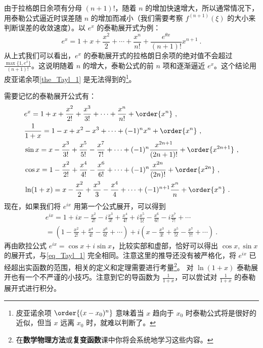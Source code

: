由于拉格朗日余项有分母 $(n+1)!$，随着 $n$ 的增加快速增大，所以通常情况下，用泰勒公式逼近时误差随 $n$ 的增加而减小（我们需要考察 $f^{(n+1)}(\xi)$ 的大小来判断误差的收敛速度）。以 $e^x$ 的泰勒展开式为例：
\begin{equation}
e^x=1+x+\frac{x^2}{2}+\cdots+\frac{x^n}{n!}+\frac{e^{\theta x}}{(n+1)!}x^{n+1}~.
\end{equation}
从上式我们可以看出，$e^x$ 的泰勒展开式的拉格朗日余项的绝对值不会超过 $\frac{\max\{1,e^x\}}{(n+1)!}$。这说明随着 $n$ 的增大，泰勒公式的前 $n$ 项和逐渐逼近 $e^x$。这个结论用皮亚诺余项\autoref{the_Tayl_1} 是无法得到的\footnote{皮亚诺余项 $\order{(x-x_0)^n}$ 意味着当 $x$ 趋向于 $x_0$ 时泰勒公式将是很好的近似，但当 $x$ 远离 $x_0$ 时，就难以判断了。}。

需要记忆的泰勒展开公式有：
\begin{equation}\label{eq_Tayl_1}
\begin{aligned}
&e^x=1+x+\frac{x^2}{2!}+\frac{x^3}{3!}+\cdots+\frac{x^n}{n!}+\order{x^n}~,\\
&\frac{1}{1+x}=1-x+x^2-x^3+\cdots+(-1)^nx^n+\order{x^n}~,\\
&\sin x=x-\frac{x^3}{3!}+\frac{x^5}{5!}-\frac{x^7}{7!}+\cdots+(-1)^n\frac{x^{2n+1}}{(2n+1)!}+\order{x^{2n+1}}~,\\
&\cos x=1-\frac{x^2}{2!}+\frac{x^4}{4!}-\frac{x^6}{6!}+\cdots+(-1)^n\frac{x^{2n}}{(2n)!}+\order{x^{2n}}~,\\
&\ln (1+x)=x-\frac{x^2}{2}+\frac{x^3}{3}-\frac{x^4}{4}+\cdots+(-1)^{n+1}\frac{x^n}{n}+\order{x^n}~.\\
\end{aligned}
\end{equation}
现在，如果我们将 $e^{ix}$ 用第一个公式展开，可以得到
\begin{equation}
\begin{aligned}
e^{ix}=1+ix-\frac{x^2}{2!}-i\frac{x^3}{3!}+\frac{x^4}{4!}+i\frac{x^5}{5!}-\frac{x^6}{6!}-i\frac{x^7}{7!}+\cdots\\
=(1-\frac{x^2}{2!}+\frac{x^4}{4!}-\frac{x^6}{6!}+\cdots)+i(x-\frac{x^3}{3!}+\frac{x^5}{5!}-\frac{x^7}{7!}+\cdots)~.
\end{aligned}
\end{equation}
再由欧拉公式 $e^{ix}=\cos x+i\sin x$，比较实部和虚部，恰好可以得出 $\cos x,\sin x$ 的展开式，与\autoref{eq_Tayl_1} 完全相同。注意这里的推导还没有被严格化，将 $e^{ix}$ 已经超出实函数的范围，相关的定义和定理需要进行考量\footnote{在\textbf{数学物理方法}或\textbf{复变函数}课中你将会系统地学习这些内容。}。
对 $\ln(1+x)$ 泰勒展开也有一个不严谨的小技巧。注意到它的导函数为 $\frac{1}{1+x}$，可以尝试对 $\frac{1}{1+x}$ 的泰勒展开式进行积分。
